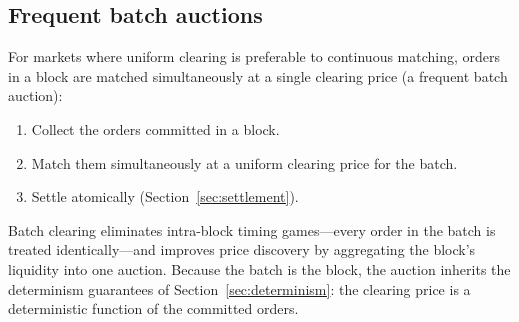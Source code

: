 \subsection{Frequent batch auctions}

For markets where uniform clearing is preferable to continuous matching, orders in a
block are matched simultaneously at a single clearing price (a frequent batch auction):

\begin{enumerate}
  \item Collect the orders committed in a block.
  \item Match them simultaneously at a uniform clearing price for the batch.
  \item Settle atomically (Section~\ref{sec:settlement}).
\end{enumerate}

Batch clearing eliminates intra-block timing games---every order in the batch is treated
identically---and improves price discovery by aggregating the block's liquidity into one
auction. Because the batch is the block, the auction inherits the determinism guarantees
of Section~\ref{sec:determinism}: the clearing price is a deterministic function of the
committed orders.
